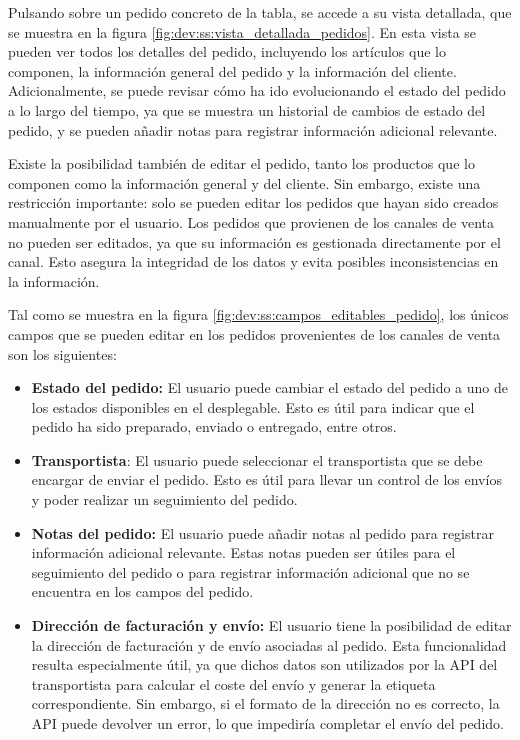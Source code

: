 Pulsando sobre un pedido concreto de la tabla, se accede a su vista detallada, que se muestra en la figura \ref{fig:dev:ss:vista_detallada_pedidos}. En esta vista se pueden ver todos los detalles del pedido, incluyendo los artículos que lo componen, la información general del pedido y la información del cliente. Adicionalmente, se puede revisar cómo ha ido evolucionando el estado del pedido a lo largo del tiempo, ya que se muestra un historial de cambios de estado del pedido, y se pueden añadir notas para registrar información adicional relevante.

Existe la posibilidad también de editar el pedido, tanto los productos que lo componen como la información general y del cliente. Sin embargo, existe una restricción importante: solo se pueden editar los pedidos que hayan sido creados manualmente por el usuario. Los pedidos que provienen de los canales de venta no pueden ser editados, ya que su información es gestionada directamente por el canal. Esto asegura la integridad de los datos y evita posibles inconsistencias en la información.

Tal como se muestra en la figura \ref{fig:dev:ss:campos_editables_pedido}, los únicos campos que se pueden editar en los pedidos provenientes de los canales de venta son los siguientes:

\begin{itemize}
    \item \textbf{Estado del pedido:} El usuario puede cambiar el estado del pedido a uno de los estados disponibles en el desplegable. Esto es útil para indicar que el pedido ha sido preparado, enviado o entregado, entre otros.
    \item \textbf{Transportista}: El usuario puede seleccionar el transportista que se debe encargar de enviar el pedido. Esto es útil para llevar un control de los envíos y poder realizar un seguimiento del pedido.
    \item \textbf{Notas del pedido:} El usuario puede añadir notas al pedido para registrar información adicional relevante. Estas notas pueden ser útiles para el seguimiento del pedido o para registrar información adicional que no se encuentra en los campos del pedido.
    \item \textbf{Dirección de facturación y envío:} El usuario tiene la posibilidad de editar la dirección de facturación y de envío asociadas al pedido. Esta funcionalidad resulta especialmente útil, ya que dichos datos son utilizados por la API del transportista para calcular el coste del envío y generar la etiqueta correspondiente. Sin embargo, si el formato de la dirección no es correcto, la API puede devolver un error, lo que impediría completar el envío del pedido.
\end{itemize}


